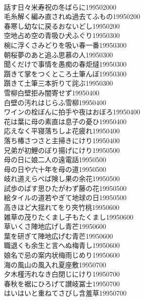 \begin{multicols}{2}
\\話す日々米寿祝の冬ばらに\hfill{199502000}
\\毛糸解く編み直されぬ過去てふもの\hfill{19950200}
\\春寒し幼なに戻るおないどし\hfill{19950200}
\\空地占め空の青吸ひ犬ふぐり\hfill{19950300}
\\椀に浮くさみどりを吸い春一番\hfill{19950300}
\\朝桜夢のあと追ふ思慕の人\hfill{19950300}
\\聞くだけで事情を愚痴の春炬燵\hfill{19950300}
\\躓きて掌をつくところ土筆んぼ\hfill{19950300}
\\躓きて土筆三本折りて詫ぶ\hfill{19950300}
\\雪柳白壁拒み闇寄せず\hfill{19950400}
\\白壁の汚れはじらふ雪柳\hfill{19950400}
\\ワインの栓ぼんに拍手や夜はおぼろ\hfill{19950400}
\\花は葉に母の素直は息子の憂ひ\hfill{19950400}
\\応えなく平寝落ちしよ花疲れ\hfill{19950400}
\\落ち椿さつさと主掃きにけり\hfill{19950400}
\\兄弟が初鯉のぼり揚げにけり\hfill{19950500}
\\母の日に娘二人の遠電話\hfill{19950500}
\\母の日や六十年を母の道\hfill{19950500}
\\岐れ道えらべば険し果の余花\hfill{19950500}
\\試歩のばす思ひたがわず藤の花\hfill{19950500}
\\絵タイルの道若やぎて地球の日\hfill{19950500}
\\高きほど大揺れてをり夾竹桃\hfill{19950600}
\\雑草の茂りたくまし子もたくまし\hfill{19950600}
\\草いくさ陣地広げし青芒\hfill{19950600}
\\葉を研ぎて陣地広げむ青芒\hfill{19950600}
\\職退くも余生と言へぬ梅青し\hfill{19950600}
\\娘名で忌の案内状梅雨じめり\hfill{19950600}
\\海の風山の風入れ夏座敷\hfill{19950700}
\\夕木槿汚れなき白閉じにけり\hfill{19950700}
\\春秋を裾にひろげて讃岐冨士\hfill{19950700}
\\はいはいと重ねてさびし含羞草\hfill{19950700}

\end{multicols}
